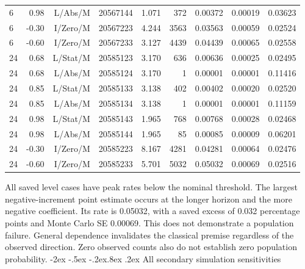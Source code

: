 \documentclass[10pt,a4paper]{article}
\makeatletter
\renewcommand\section{\@startsection{section}{1}{\z@}%
  {-2ex \@plus -.5ex \@minus -.2ex}{.8ex \@plus .2ex}%
  {\normalfont\large\bfseries}}
\makeatother
\begin{document}
\begin{longtable}{lrrrrrrrr}
6 & 0.98 & L/Abs/M & 20567144 & 1.071 & 372 & 0.00372 & 0.00019 & 0.03623 \\
6 & -0.30 & I/Zero/M & 20567223 & 4.244 & 3563 & 0.03563 & 0.00059 & 0.02524 \\
6 & -0.60 & I/Zero/M & 20567233 & 3.127 & 4439 & 0.04439 & 0.00065 & 0.02558 \\
24 & 0.68 & L/Stat/M & 20585123 & 3.170 & 636 & 0.00636 & 0.00025 & 0.02495 \\
24 & 0.68 & L/Abs/M & 20585124 & 3.170 & 1 & 0.00001 & 0.00001 & 0.11416 \\
24 & 0.85 & L/Stat/M & 20585133 & 3.138 & 402 & 0.00402 & 0.00020 & 0.02520 \\
24 & 0.85 & L/Abs/M & 20585134 & 3.138 & 1 & 0.00001 & 0.00001 & 0.11159 \\
24 & 0.98 & L/Stat/M & 20585143 & 1.965 & 768 & 0.00768 & 0.00028 & 0.02468 \\
24 & 0.98 & L/Abs/M & 20585144 & 1.965 & 85 & 0.00085 & 0.00009 & 0.06201 \\
24 & -0.30 & I/Zero/M & 20585223 & 8.167 & 4281 & 0.04281 & 0.00064 & 0.02476 \\
24 & -0.60 & I/Zero/M & 20585233 & 5.701 & 5032 & 0.05032 & 0.00069 & 0.02516 \\
\end{longtable}
\endgroup

All saved level cases have peak rates below the nominal threshold.
The largest negative-increment point estimate occurs at the longer horizon and
the more negative coefficient. Its rate is 0.05032,
with a saved excess of 0.032
percentage points and Monte Carlo SE 0.00069.
This does not demonstrate a population failure. General dependence invalidates the
classical premise regardless of the observed direction. Zero observed counts
also do not establish zero population probability.\section{All secondary simulation sensitivities}\label{sup:simulation-secondary}
\end{document}
